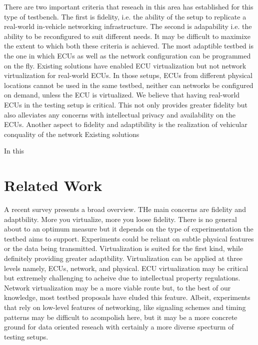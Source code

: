 \documentclass[letterpaper,twocolumn,12pt]{article}
\begin{document}
There are two important criteria that reseach in this area has established for this type of testbench. The first is fidelity, i.e. the ability of the setup to replicate a real-world in-vehicle networking infrastructure. The second is adapability i.e. the ability to be reconfigured to suit different needs. It may be difficult to maximixe the extent to which both these criteria is achieved. The most adaptible testbed is the one in which ECUs as well as the network  configuration can be programmed on the fly. Existing solutions have enabled ECU virtualization but not network virtualization for real-world ECUs. In those setups, ECUs from different physical locations cannot be used in the same testbed, neither can networks be configured on demand, unless the ECU is virtualized.
We believe that having real-world ECUs in the testing setup is critical. This not only provides greater fidelity but also alleviates any concerns with intellectual privacy and availability on the ECUs. Another aspect to fidelity and adaptibility is the realization of vehicular conquality of the network 
Existing solutions 

In this 

\section{Related Work}
A recent survey presents a broad overview. 
THe main concerns are fidelity and adaptbility. More you virtualize, more you loose fidelity. 
There is no general about to an optimum measure but it depends on the type of experimentation the testbed aims to support. Experiments could be reliant on subtle physical features or the data being transmitted. Virtualization is suited for the first kind, while definitely providing greater adaptbility. Virtualization can be applied at three levels namely, ECUs, network, and physical. 
ECU virtualization may be critical but extremely challenging to acheive due to intellectual property regulations. 
Network virtualization may be a more viable route but, to the best of our knowledge, most testbed proposals have eluded this feature. Albeit, experiments that rely on low-level features of networking, like signaling schemes and timing patterns may be difficult to acompolish here, but it may be a more concrete ground for data oriented reseach with certainly a more diverse specturm of testing setups. 


\end{document}
